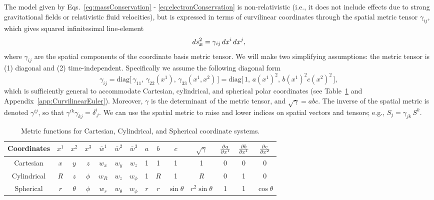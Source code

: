 \documentclass[10pt,preprint]{aastex}
\begin{document}
The model given by Eqs.~\eqref{eq:massConservation} - \eqref{eq:electronConservation} is non-relativistic (i.e., it does not include effects due to strong gravitational fields or relativistic fluid velocities), but is expressed in terms of curvilinear coordinates through the spatial metric tensor $\gamma_{ij}$, which gives squared infinitesimal line-element
\begin{equation}
  ds_{\boldsymbol{x}}^{2}=\gamma_{ij}\,dx^{i}\,dx^{j},
\end{equation}
where $\gamma_{ij}$ are the spatial components of the coordinate basis metric tensor.  
We will make two simplifying assumptions: the metric tensor is (1) diagonal and (2) time-independent.  
Specifically we assume the following diagonal form
\begin{equation}
  \gamma_{ij}
  =\mbox{diag}\big[\,\gamma_{11},\,\gamma_{22}(x^{1}),\,\gamma_{33}(x^{1},x^{2})\,\big]
  =\mbox{diag}\big[\,1,\,a(x^{1})^{2},\,b(x^{1})^{2}c(x^{2})^{2}\,\big], 
  \label{eq:threeMetric}
\end{equation}
which is sufficiently general to accommodate Cartesian, cylindrical, and spherical polar coordinates (see Table~\ref{tab:metricFunctions} and Appendix~\ref{app:CurvilinearEuler}).  
Moreover, $\gamma$ is the determinant of the metric tensor, and $\sqrt{\gamma}=abc$.  
The inverse of the spatial metric is denoted $\gamma^{ij}$, so that $\gamma^{ik}\gamma_{kj}=\delta^{i}_{~j}$.  
We can use the spatial metric to raise and lower indices on spatial vectors and tensors; e.g., $S_{j}=\gamma_{jk}\,S^{k}$.  

\begin{table}
  \begin{center}
  \caption{Metric functions for Cartesian, Cylindrical, and Spherical coordinate systems.\label{tab:metricFunctions}}
  \begin{tabular}{cccccccccccccc}
    \midrule
    Coordinates & $x^{1}$ & $x^{2}$ & $x^{3}$ & $\bar{w}^{1}$ & $\bar{w}^{2}$ & $\bar{w}^{3}$ & $a$ & $b$ & $c$ & $\sqrt{\gamma}$
    & $\frac{\partial a}{\partial x^{1}}$ & $\frac{\partial b}{\partial x^{1}}$ & $\frac{\partial c}{\partial x^{2}}$ \\
    \midrule
    \midrule
    Cartesian & $x$ & $y$ & $z$ & $w_{x}$ & $w_{y}$ & $w_{z}$ & 1 & 1 & 1 & 1 & 0 & 0 & 0 \\
    Cylindrical & $R$ & $z$ & $\phi$ & $w_{R}$ & $w_{z}$ & $w_{\phi}$ & 1 & $R$ & 1 & $R$ & 0 & 1 & 0 \\
    Spherical & $r$ & $\theta$ & $\phi$ & $w_{r}$ & $w_{\theta}$ & $w_{\phi}$ & $r$ & $r$ & $\sin\theta$ & $r^{2}\sin\theta$ & 1 & 1 & $\cos\theta$ \\
    \midrule
    \midrule
  \end{tabular}
  \end{center}
\end{table}
\end{document}
